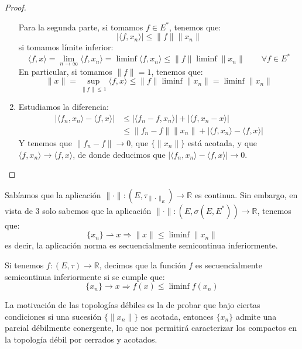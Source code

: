 \begin{prop}
\begin{proof}
\begin{enumerate}
                Para la segunda parte, si tomamos $f\in E^\ast$, tenemos que:
                \begin{equation*}
                    |\langle f,x_n \rangle | \leq \|f\|\|x_n\|
                \end{equation*}
                si tomamos límite inferior:
                \begin{equation*}
                    \langle f,x \rangle = \lim_{n\to\infty}\langle f,x_n \rangle  = \liminf \langle f,x_n \rangle  \leq \|f\|\liminf \|x_n\| \qquad \forall f\in E^\ast
                \end{equation*}
                En particular, si tomamos $\|f\| = 1$, tenemos que:
                \begin{equation*}
                    \|x\| = \sup_{\|f\|\leq 1}\langle f,x \rangle  \leq \|f\| \liminf \|x_n\| = \liminf \|x_n\|
                \end{equation*}
            \item Estudiamos la diferencia:
                \begin{align*}
                    |\langle f_n,x_n \rangle  - \langle f,x \rangle | &\leq |\langle f_n-f,x_n \rangle | + |\langle f,x_n-x \rangle |  \\
                                                                      &\leq \|f_n-f\| \|x_n\| + |\langle f,x_n \rangle -\langle f,x \rangle |
                \end{align*}
                Y tenemos que $\|f_n-f\| \to 0$, que $\{\|x_n\|\}$ está acotada, y que $\langle f,x_n \rangle \to \langle f,x \rangle $, de donde deducimos que $|\langle f_n,x_n \rangle -\langle f,x \rangle |\to 0$.
        \end{enumerate}
    \end{proof}
\end{prop}

\noindent
Sabíamos que la aplicación $\|\cdot \|:(E,\tau_{\|\cdot \|_E})\to \mathbb{R}$ es continua. Sin embargo, en vista de 3 solo sabemos que la aplicación $\|\cdot \|:(E,\sigma(E,E^\ast))\to \mathbb{R}$, tenemos que:
\begin{equation*}
    \{x_n\}\rightharpoonup x \Longrightarrow \|x\| \leq \liminf \|x_n\|
\end{equation*}
es decir, la aplicación norma es secuencialmente semicontinua inferiormente.

\begin{definicion}
    Si tenemos $f:(E,\tau)\to \mathbb{R}$, decimos que la función $f$ es secuencialmente semicontinua inferiormente si se cumple que:
    \begin{equation*}
        \{x_n\} \to x \Longrightarrow f(x) \leq \liminf f(x_n)
    \end{equation*}
\end{definicion}

\noindent
La motivación de las topologías débiles es la de probar que bajo ciertas condiciones si una sucesión $\{\|x_n\|\}$ es acotada, entonces $\{x_n\}$ admite una parcial débilmente conergente, lo que nos permitirá caracterizar los compactos en la topología débil por cerrados y acotados.
